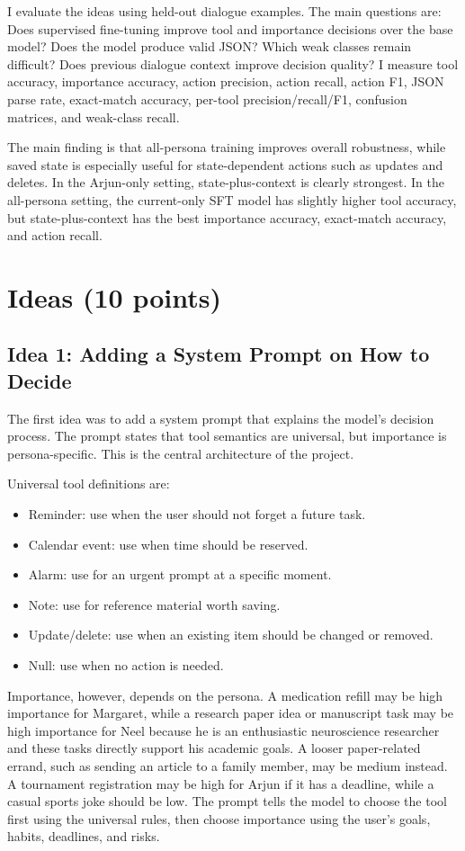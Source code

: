 \documentclass[11pt,a4paper]{article}
\begin{document}
I evaluate the ideas using held-out dialogue examples. The main questions are: Does supervised fine-tuning improve tool and importance decisions over the base model? Does the model produce valid JSON? Which weak classes remain difficult? Does previous dialogue context improve decision quality? I measure tool accuracy, importance accuracy, action precision, action recall, action F1, JSON parse rate, exact-match accuracy, per-tool precision/recall/F1, confusion matrices, and weak-class recall.

The main finding is that all-persona training improves overall robustness, while saved state is especially useful for state-dependent actions such as updates and deletes. In the Arjun-only setting, state-plus-context is clearly strongest. In the all-persona setting, the current-only SFT model has slightly higher tool accuracy, but state-plus-context has the best importance accuracy, exact-match accuracy, and action recall.

\section{Ideas (10 points)}

\subsection{Idea 1: Adding a System Prompt on How to Decide}

The first idea was to add a system prompt that explains the model's decision process. The prompt states that tool semantics are universal, but importance is persona-specific. This is the central architecture of the project.

Universal tool definitions are:
\begin{itemize}
    \item Reminder: use when the user should not forget a future task.
    \item Calendar event: use when time should be reserved.
    \item Alarm: use for an urgent prompt at a specific moment.
    \item Note: use for reference material worth saving.
    \item Update/delete: use when an existing item should be changed or removed.
    \item Null: use when no action is needed.
\end{itemize}

Importance, however, depends on the persona. A medication refill may be high importance for Margaret, while a research paper idea or manuscript task may be high importance for Neel because he is an enthusiastic neuroscience researcher and these tasks directly support his academic goals. A looser paper-related errand, such as sending an article to a family member, may be medium instead. A tournament registration may be high for Arjun if it has a deadline, while a casual sports joke should be low. The prompt tells the model to choose the tool first using the universal rules, then choose importance using the user's goals, habits, deadlines, and risks.
\end{document}
